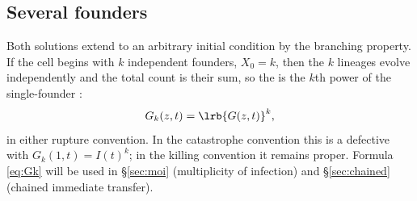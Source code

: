 \subsection{Several founders}
\label{sec:pgf-k-founders}

Both solutions extend to an arbitrary initial condition by the branching
property. If the cell begins with $k$ independent founders, $X_0=k$, then the
$k$ lineages evolve independently and the total count is their sum, so the
\pgf{} is the $k$th power of the single-founder \pgf:
\begin{equation}
G_k(z,t) = \lrb{G(z,t)}^k,
\label{eq:Gk}
\end{equation}
in either rupture convention. In the catastrophe convention this is a
defective \pgf{} with $G_k(1,t)=I(t)^k$; in the killing convention it
remains proper. Formula \eqref{eq:Gk} will be used in \S\ref{sec:moi}
(multiplicity of infection) and \S\ref{sec:chained} (chained immediate
transfer).
